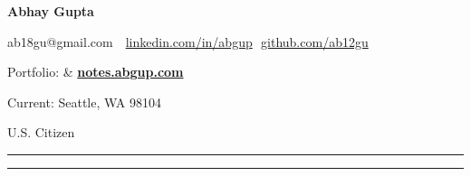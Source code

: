 
\hspace{1ex}
{\fontsize{35}{60}\textbf{Abhay Gupta}}

\vspace{-11ex}

\begin{subtitle}
    ab18gu@gmail.com
        \,\SubBulletSymbol\,
            \href{\LinkedIn}{linkedin.com/in/abgup}
                \,\SubBulletSymbol\,\href{\github}{github.com/ab12gu}
    \par{Portfolio: \color{blue} \textbf{\href{\CVWebg}{\CVWeb}{} }
    {\color{black} \& }
    {\color{blue} \textbf{\href{https://notes.abgup.com}{notes.abgup.com}}}}
    \par{Current: \color{cblue} Seattle, WA 98104}
    \par{U.S. Citizen}
\end{subtitle}

\vspace{-3ex}
{\hspace{0.07in}\noindent\color{dblue}\rule{7.1in}{0.4pt}}

\vspace{-3ex}
{\hspace{0.07in}\noindent\color{dblue}\rule{7.1in}{0.4pt}}


